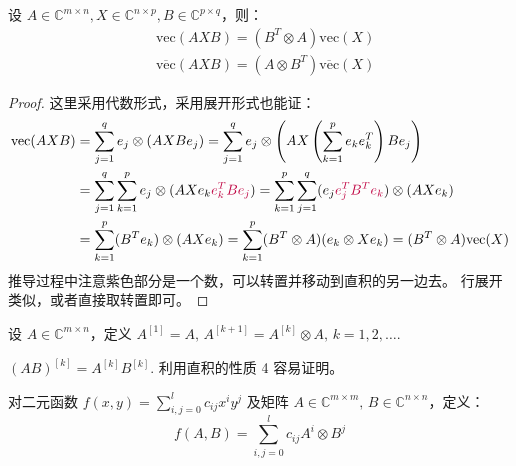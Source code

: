 \begin{theorem}
设 $A\in\mathbb C^{m\times n},X\in\mathbb C^{n\times p},B\in\mathbb C^{p\times q}$，则：
\begin{align*}
    &\text{vec}(AXB)=(B^T\otimes A)\text{vec}(X)\\
    &\overline{\text{vec}}(AXB)=(A\otimes B^T)\overline{\text{vec}}(X)
\end{align*}
\end{theorem}
\begin{proof}
这里采用代数形式，采用展开形式也能证：
\begin{align*}
    \text{vec}(AXB)&=\sum_{j=1}^qe_j\otimes(AXBe_j)=\sum_{j=1}^qe_j\otimes\left(AX\left(\sum_{k=1}^pe_ke_k^T\right)Be_j\right)\\
    &=\sum_{j=1}^q\sum_{k=1}^pe_j\otimes (AXe_k{\color{purple}e_k^TBe_j})=\sum_{k=1}^p\sum_{j=1}^q(e_j{\color{purple}e_j^TB^Te_k})\otimes (AXe_k)\\
    &=\sum_{k=1}^p(B^Te_k)\otimes (AXe_k)=\sum_{k=1}^p(B^T\otimes A)(e_k\otimes Xe_k)=(B^T\otimes A)\text{vec}(X)
\end{align*}
推导过程中注意紫色部分是一个数，可以转置并移动到直积的另一边去。
行展开类似，或者直接取转置即可。
\end{proof}

\begin{definition}[以矩阵直积定义方幂]
设 $A\in\mathbb C^{m\times n}$，定义 $A^{[1]}=A,\,A^{[k+1]}=A^{[k]}\otimes A,\,k=1,2,\ldots$.
\end{definition}

\begin{property}
$(AB)^{[k]}=A^{[k]}B^{[k]}$. 利用直积的性质 4 容易证明。
\end{property}

\begin{definition}
对二元函数 $f(x,y)=\displaystyle\sum_{i,j=0}^lc_{ij}x^iy^j$ 及矩阵 $A\in\mathbb C^{m\times m},\,B\in\mathbb C^{n\times n}$，定义：
\[
    f(A,B)=\sum_{i,j=0}^lc_{ij}A^{i}\otimes B^{j}
\]
\end{definition}

